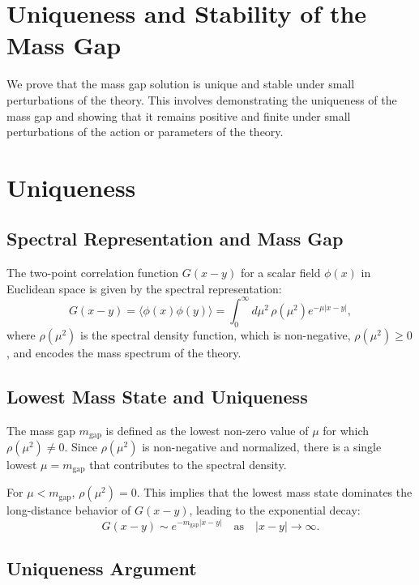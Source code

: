 \section{Uniqueness and Stability of the Mass Gap}

We prove that the mass gap solution is unique and stable under small perturbations 
of the theory. This involves demonstrating the uniqueness of the mass 
gap and showing that it remains positive and finite under small perturbations 
of the action or parameters of the theory.

\section{Uniqueness}

\subsection{Spectral Representation and Mass Gap}

The two-point correlation function \(G(x-y)\) for a scalar field \(\phi(x)\) in Euclidean space is given by the spectral representation:
\begin{equation}
G(x-y) = \langle \phi(x) \phi(y) \rangle = \int_0^\infty d\mu^2 \, \rho(\mu^2) e^{-\mu |x-y|},
\end{equation}
where \(\rho(\mu^2)\) is the spectral density function, which is non-negative, \(\rho(\mu^2) \geq 0\), and encodes the mass spectrum of the theory.

\subsection{Lowest Mass State and Uniqueness}

The mass gap \(m_{\text{gap}}\) is defined as the lowest non-zero value of \(\mu\) for which \(\rho(\mu^2) \neq 0\). Since \(\rho(\mu^2)\) is non-negative and normalized, there is a single lowest \(\mu = m_{\text{gap}}\) that contributes to the spectral density.

For \(\mu < m_{\text{gap}}\), \(\rho(\mu^2) = 0\). This implies that the lowest mass state dominates the long-distance behavior of \(G(x-y)\), leading to the exponential decay:
\begin{equation}
G(x-y) \sim e^{-m_{\text{gap}} |x-y|} \quad \text{as} \quad |x-y| \to \infty.
\end{equation}

\subsection{Uniqueness Argument}

